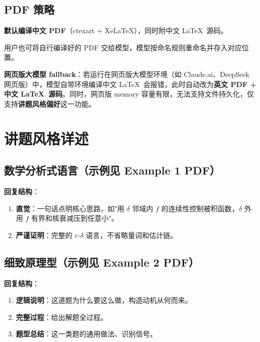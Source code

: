\documentclass[12pt,a4paper]{ctexart}
\newcommand{\style}[1]{\textcolor{B}{\textbf{#1}}}
\begin{document}
\subsection{PDF 策略}\label{sec:pdf-strategy}

\textbf{默认编译中文 PDF}（ctexart + XeLaTeX），同时附中文 \LaTeX\ 源码。

用户也可将自行编译好的 PDF 交给模型，模型按命名规则重命名并存入对应位置。

\medskip
\noindent\textbf{网页版大模型 fallback}：若运行在网页版大模型环境（如 Claude.ai、DeepSeek 网页版）中，模型自带环境编译中文 \LaTeX\ 会报错，此时自动改为\textbf{英文 PDF + 中文 \LaTeX\ 源码}。同时，网页版 memory 容量有限，无法支持文件持久化，仅支持\textbf{讲题风格偏好}这一功能。

\section{讲题风格详述}

\subsection{\style{数学分析式语言}（示例见 Example 1 PDF）}

\textbf{回复结构}：
\begin{enumerate}
  \item \textbf{直觉}：一句话点明核心思路，如"用 $\delta$ 邻域内 $f$ 的连续性控制被积函数，$\delta$ 外用 $f$ 有界和核衰减压到任意小"。
  \item \textbf{严谨证明}：完整的 $\varepsilon$-$\delta$ 语言，不省略量词和估计链。
\end{enumerate}

\subsection{\style{细致原理型}（示例见 Example 2 PDF）}

\textbf{回复结构}：
\begin{enumerate}
  \item \textbf{逻辑说明}：这道题为什么要这么做，构造动机从何而来。
  \item \textbf{完整过程}：给出解题全过程。
  \item \textbf{题型总结}：这一类题的通用做法、识别信号。
\end{enumerate}
\end{document}
